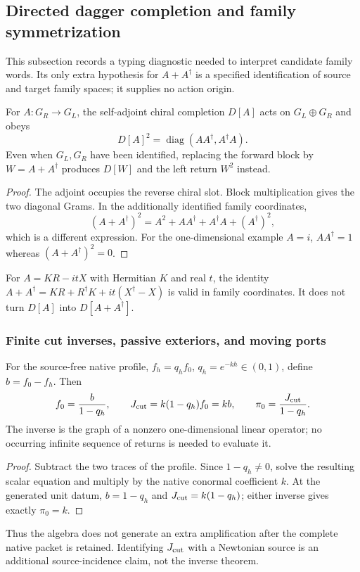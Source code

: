 \documentclass[11pt,a4paper]{article}
\begin{document}
\subsection{Directed dagger completion and family symmetrization}
\label{p3f:app:v1126-dagger-typing}
This subsection records a typing diagnostic needed to interpret candidate
family words. Its only extra hypothesis for $A+A^\dagger$ is a specified
identification of source and target family spaces; it supplies no action origin.
\begin{proposition}
\label{p3f:prop:v1126-directed-dagger}
For $A:G_R\to G_L$, the self-adjoint chiral completion $D[A]$ acts on
$G_L\oplus G_R$ and obeys
\[
 D[A]^2=\operatorname{diag}(AA^\dagger,A^\dagger A).
\]
Even when $G_L,G_R$ have been identified, replacing the forward block by
$W=A+A^\dagger$ produces $D[W]$ and the left return $W^2$ instead.
\end{proposition}
\begin{proof}
The adjoint occupies the reverse chiral slot. Block multiplication gives
the two diagonal Grams. In the additionally identified family coordinates,
\[
 (A+A^\dagger)^2=A^2+AA^\dagger+A^\dagger A+(A^\dagger)^2,
\]
which is a different expression. For the one-dimensional example $A=i$,
$AA^\dagger=1$ whereas $(A+A^\dagger)^2=0$.
\end{proof}
For $A=KR-itX$ with Hermitian $K$ and real $t$, the identity
$A+A^\dagger=KR+R^\dagger K+it(X^\dagger-X)$ is valid in family
coordinates. It does not turn $D[A]$ into $D[A+A^\dagger]$.


\subsubsection{Finite cut inverses, passive exteriors, and moving ports}
\label{p3f:app:v2109-quadratic-boundary-details}
\begin{proposition}
\label{p3f:prop:v2109-finite-cut-inverse}
For the source-free native profile, \(f_h=q_hf_0\),
\(q_h=e^{-kh}\in(0,1)\), define \(b=f_0-f_h\).  Then
\[
 f_0=\frac b{1-q_h},\qquad J_{\rm cut}=k(1-q_h)f_0=kb,
 \qquad \pi_0=\frac{J_{\rm cut}}{1-q_h}.
\]
The inverse is the graph of a nonzero one-dimensional linear operator; no
occurring infinite sequence of returns is needed to evaluate it.
\end{proposition}
\begin{proof}
Subtract the two traces of the profile.  Since \(1-q_h\ne0\), solve the
resulting scalar equation and multiply by the native conormal coefficient
\(k\).  At the generated unit datum, \(b=1-q_h\) and
\(J_{\rm cut}=k(1-q_h)\); either inverse gives exactly \(\pi_0=k\).
\end{proof}
Thus the algebra does not generate an extra amplification after the complete
native packet is retained.  Identifying \(J_{\rm cut}\) with a Newtonian
source is an additional source-incidence claim, not the inverse theorem.
\end{document}
